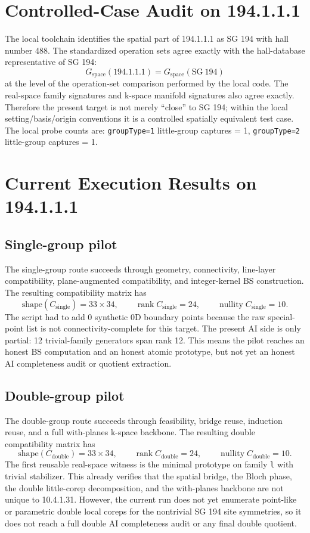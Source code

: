 \documentclass[11pt]{article}
\begin{document}
\section{Controlled-Case Audit on 194.1.1.1}
The local toolchain identifies the spatial part of 194.1.1.1 as SG 194 with hall number 488. The standardized operation sets agree exactly with the hall-database representative of SG 194:
\[
G_{\mathrm{space}}(194.1.1.1) = G_{\mathrm{space}}(\mathrm{SG}\ 194)
\]
at the level of the operation-set comparison performed by the local code. The real-space family signatures and k-space manifold signatures also agree exactly. Therefore the present target is not merely ``close'' to SG 194; within the local setting/basis/origin conventions it is a controlled spatially equivalent test case. The local probe counts are: \texttt{groupType=1} little-group captures = 1, \texttt{groupType=2} little-group captures = 1.

\section{Current Execution Results on 194.1.1.1}
\subsection*{Single-group pilot}
The single-group route succeeds through geometry, connectivity, line-layer compatibility, plane-augmented compatibility, and integer-kernel BS construction. The resulting compatibility matrix has
\[
\mathrm{shape}(C_{\mathrm{single}}) = 33 \times 34, \qquad
\operatorname{rank} C_{\mathrm{single}} = 24, \qquad
\operatorname{nullity} C_{\mathrm{single}} = 10.
\]
The script had to add 0 synthetic 0D boundary points because the raw special-point list is not connectivity-complete for this target. The present AI side is only partial: 12 trivial-family generators span rank 12. This means the pilot reaches an honest BS computation and an honest atomic prototype, but not yet an honest AI completeness audit or quotient extraction.

\subsection*{Double-group pilot}
The double-group route succeeds through feasibility, bridge reuse, induction reuse, and a full with-planes k-space backbone. The resulting double compatibility matrix has
\[
\mathrm{shape}(C_{\mathrm{double}}) = 33 \times 34, \qquad
\operatorname{rank} C_{\mathrm{double}} = 24, \qquad
\operatorname{nullity} C_{\mathrm{double}} = 10.
\]
The first reusable real-space witness is the minimal prototype on family \texttt{l} with trivial stabilizer. This already verifies that the spatial bridge, the Bloch phase, the double little-corep decomposition, and the with-planes backbone are not unique to 10.4.1.31. However, the current run does not yet enumerate point-like or parametric double local coreps for the nontrivial SG 194 site symmetries, so it does not reach a full double AI completeness audit or any final double quotient.
\end{document}

